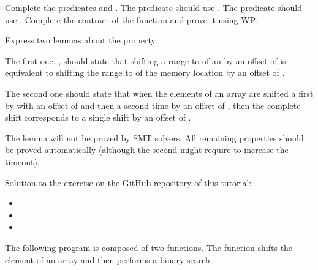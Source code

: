

Complete the predicates  and .
The  predicate should use .
The  predicate should use .
Complete the contract of the  function and prove
it using WP.


Express two lemmas about the  property.


The first one, , should state that shifting a range
 to  of an  by an
offset of  is equivalent to shifting the range  to
 of the memory location  by an offset
of .



The second one should state that when the elements of an array are shifted a
first by with an offset of  and then a second time by an offset
of , then the complete shift corresponds to a single shift by an
offset of .



The lemma  will not be proved by SMT solvers. All
remaining properties should be proved automatically (although the second might
require to increase the timeout).


\begin{Information}
  Solution to the exercise on the GitHub repository of this tutorial:
  \begin{itemize}
    \item {}
    \item {}
    \item {}
  \end{itemize}
\end{Information}





The following program is composed of two functions. The function
 shifts the element of an array and then
performs a binary search.





